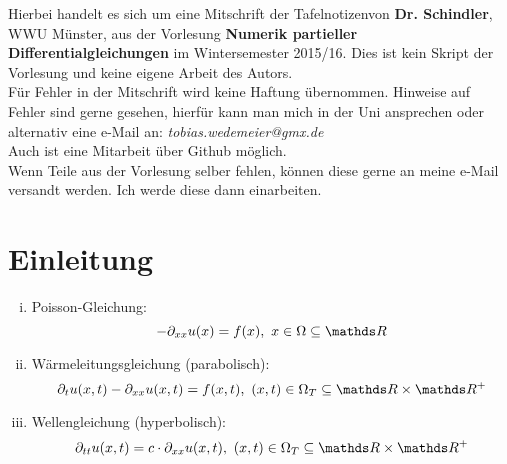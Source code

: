 

\newcommand{\vorlesung}{Numerik partieller Differentialgleichungen}
\newcommand{\Prof}{Dr. Schindler}
\newcommand{\subt}{Mitschrift der Tafelnotizen}






\maketitle
\thispagestyle{empty}
\cleardoubleoddemptypage

\thispagestyle{empty}
\vspace*{\fill}
\begin{center}
	Hierbei handelt es sich um eine \subt von \textbf{\Prof}, WWU Münster, aus der Vorlesung \textbf{\vorlesung} im Wintersemester 2015/16. 
	Dies ist kein Skript der Vorlesung und keine eigene Arbeit des Autors.\\
	\vspace{2cm}
	Für Fehler in der Mitschrift wird keine Haftung übernommen. 
	Hinweise auf Fehler sind gerne gesehen, hierfür kann man mich in der Uni ansprechen oder alternativ eine e-Mail an: \textit{tobias.wedemeier@gmx.de}\\
	Auch ist eine Mitarbeit über Github möglich.\\
	\vspace{2cm}
	Wenn Teile aus der Vorlesung selber fehlen, können diese gerne an meine e-Mail versandt werden. 
	Ich werde diese dann einarbeiten.\\
\end{center}
\vspace*{\fill}
\cleardoubleoddemptypage


\tableofcontents
\cleardoubleoddemptypage %

\cleardoubleoddemptypage
{}
\setcounter{page}{1}
\setcounter{section}{0}

\section{Einleitung}

\begin{enumerate}[(i)]
	\item Poisson-Gleichung: 
	\[
	-\partial_{xx} u(x) = f(x), ~ x\in \Omega \subseteq \R
	\]
	\item Wärmeleitungsgleichung (parabolisch):
	\[
	\partial_t u(x,t)-\partial_{xx} u(x,t)= f(x,t), ~(x,t)\in \Omega_T\subseteq \R \times \R^+
	\]
	\item Wellengleichung (hyperbolisch):
	\[
	\partial_{tt} u(x,t) = c \cdot \partial_{xx} u(x,t),~ (x,t)\in \Omega_T \subseteq \R \times \R^+
	\]
\end{enumerate}


